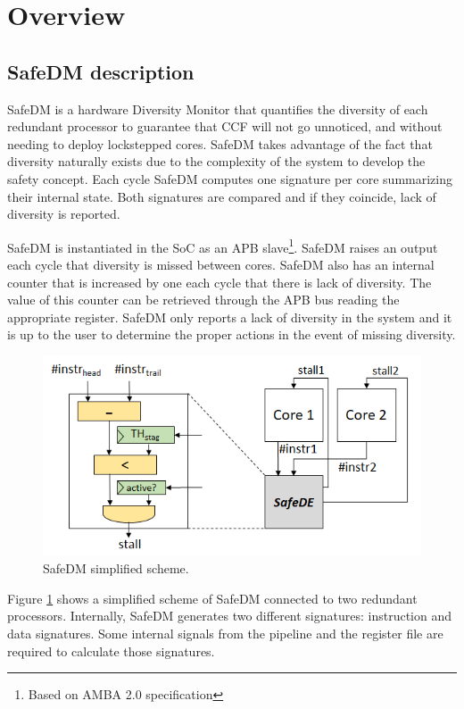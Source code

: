 \newpage
\section{Overview}
\label{chapter1}

\subsection{SafeDM description}
\label{descrption_subsec}

SafeDM is a hardware Diversity Monitor that quantifies the diversity of each redundant processor to guarantee that CCF will not go unnoticed, and without needing to deploy lockstepped cores. SafeDM takes advantage of the fact that diversity naturally exists due to the complexity of the system to develop the safety concept. Each cycle SafeDM computes one signature per core summarizing their internal state. Both signatures are compared and if they coincide, lack of diversity is reported.

SafeDM is instantiated in the SoC as an APB slave\footnote{Based on AMBA 2.0 specification}. SafeDM raises an output each cycle that diversity is missed between cores. SafeDM also has an internal counter that is increased by one each cycle that there is lack of diversity. The value of this counter can be retrieved through the APB bus reading the appropriate register. SafeDM only reports a lack of diversity in the system and it is up to the user to determine the proper actions in the event of missing diversity.


\begin{figure}[H]
	\includegraphics[keepaspectratio,width=\columnwidth]{img/safede}
        \caption{SafeDM simplified scheme.} %
	\label{fig:simplified_scheme}
\end{figure}
Figure \ref{fig:simplified_scheme} shows a simplified scheme of SafeDM connected to two redundant processors. Internally, SafeDM generates two different signatures: instruction and data signatures. Some internal signals from the pipeline and the register file are required to calculate those signatures.

